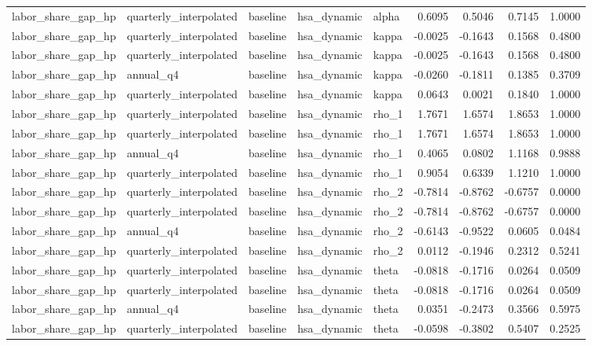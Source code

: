 \begin{tabular}{lllllrrrr}
labor\_share\_gap\_hp & quarterly\_interpolated & baseline & hsa\_dynamic & alpha & 0.6095 & 0.5046 & 0.7145 & 1.0000 \\
labor\_share\_gap\_hp & quarterly\_interpolated & baseline & hsa\_dynamic & kappa & -0.0025 & -0.1643 & 0.1568 & 0.4800 \\
labor\_share\_gap\_hp & quarterly\_interpolated & baseline & hsa\_dynamic & kappa & -0.0025 & -0.1643 & 0.1568 & 0.4800 \\
labor\_share\_gap\_hp & annual\_q4 & baseline & hsa\_dynamic & kappa & -0.0260 & -0.1811 & 0.1385 & 0.3709 \\
labor\_share\_gap\_hp & quarterly\_interpolated & baseline & hsa\_dynamic & kappa & 0.0643 & 0.0021 & 0.1840 & 1.0000 \\
labor\_share\_gap\_hp & quarterly\_interpolated & baseline & hsa\_dynamic & rho\_1 & 1.7671 & 1.6574 & 1.8653 & 1.0000 \\
labor\_share\_gap\_hp & quarterly\_interpolated & baseline & hsa\_dynamic & rho\_1 & 1.7671 & 1.6574 & 1.8653 & 1.0000 \\
labor\_share\_gap\_hp & annual\_q4 & baseline & hsa\_dynamic & rho\_1 & 0.4065 & 0.0802 & 1.1168 & 0.9888 \\
labor\_share\_gap\_hp & quarterly\_interpolated & baseline & hsa\_dynamic & rho\_1 & 0.9054 & 0.6339 & 1.1210 & 1.0000 \\
labor\_share\_gap\_hp & quarterly\_interpolated & baseline & hsa\_dynamic & rho\_2 & -0.7814 & -0.8762 & -0.6757 & 0.0000 \\
labor\_share\_gap\_hp & quarterly\_interpolated & baseline & hsa\_dynamic & rho\_2 & -0.7814 & -0.8762 & -0.6757 & 0.0000 \\
labor\_share\_gap\_hp & annual\_q4 & baseline & hsa\_dynamic & rho\_2 & -0.6143 & -0.9522 & 0.0605 & 0.0484 \\
labor\_share\_gap\_hp & quarterly\_interpolated & baseline & hsa\_dynamic & rho\_2 & 0.0112 & -0.1946 & 0.2312 & 0.5241 \\
labor\_share\_gap\_hp & quarterly\_interpolated & baseline & hsa\_dynamic & theta & -0.0818 & -0.1716 & 0.0264 & 0.0509 \\
labor\_share\_gap\_hp & quarterly\_interpolated & baseline & hsa\_dynamic & theta & -0.0818 & -0.1716 & 0.0264 & 0.0509 \\
labor\_share\_gap\_hp & annual\_q4 & baseline & hsa\_dynamic & theta & 0.0351 & -0.2473 & 0.3566 & 0.5975 \\
labor\_share\_gap\_hp & quarterly\_interpolated & baseline & hsa\_dynamic & theta & -0.0598 & -0.3802 & 0.5407 & 0.2525 \\

\end{tabular}
